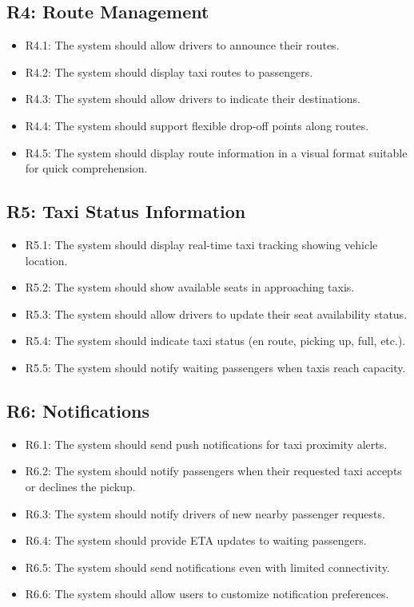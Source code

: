 \documentclass[a4paper,12pt]{article}
\begin{document}
\subsection*{R4: Route Management}
\begin{itemize}
    \item R4.1: The system should allow drivers to announce their routes.
    \item R4.2: The system should display taxi routes to passengers.
    \item R4.3: The system should allow drivers to indicate their destinations.
    \item R4.4: The system should support flexible drop-off points along routes.
    \item R4.5: The system should display route information in a visual format suitable for quick comprehension.
\end{itemize}

\subsection*{R5: Taxi Status Information}
\begin{itemize}
    \item R5.1: The system should display real-time taxi tracking showing vehicle location.
    \item R5.2: The system should show available seats in approaching taxis.
    \item R5.3: The system should allow drivers to update their seat availability status.
    \item R5.4: The system should indicate taxi status (en route, picking up, full, etc.).
    \item R5.5: The system should notify waiting passengers when taxis reach capacity.
\end{itemize}

\subsection*{R6: Notifications}
\begin{itemize}
    \item R6.1: The system should send push notifications for taxi proximity alerts.
    \item R6.2: The system should notify passengers when their requested taxi accepts or declines the pickup.
    \item R6.3: The system should notify drivers of new nearby passenger requests.
    \item R6.4: The system should provide ETA updates to waiting passengers.
    \item R6.5: The system should send notifications even with limited connectivity.
    \item R6.6: The system should allow users to customize notification preferences.
\end{itemize}
\end{document}
